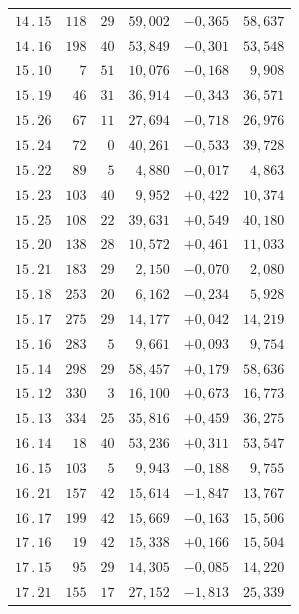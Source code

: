 \begin{center}
\begin{tabular}[t]{|c|r@{\;}r@{\;}r|r|r|}
$14\, .\, 15$ & $118$ & $29$ & $59{,}002$ & $-0{,}365$ & $58{,}637$\\
$14\, .\, 16$ & $198$ & $40$ & $53{,}849$ & $-0{,}301$ & $53{,}548$\\[7pt]
$15\, .\, 10$ & $7$ & $51$ & $10{,}076$ & $-0{,}168$ & $9{,}908$\\
$15\, .\, 19$ & $46$ & $31$ & $36{,}914$ & $-0{,}343$ & $36{,}571$\\
$15\, .\, 26$ & $67$ & $11$ & $27{,}694$ & $-0{,}718$ & $26{,}976$\\
$15\, .\, 24$ & $72$ & $0$ & $40{,}261$ & $-0{,}533$ & $39{,}728$\\
$15\, .\, 22$ & $89$ & $5$ & $4{,}880$ & $-0{,}017$ & $4{,}863$\\
$15\, .\, 23$ & $103$ & $40$ & $9{,}952$ & $+0{,}422$ & $10{,}374$\\
$15\, .\, 25$ & $108$ & $22$ & $39{,}631$ & $+0{,}549$ & $40{,}180$\\
$15\, .\, 20$ & $138$ & $28$ & $10{,}572$ & $+0{,}461$ & $11{,}033$\\
$15\, .\, 21$ & $183$ & $29$ & $2{,}150$ & $-0{,}070$ & $2{,}080$\\
$15\, .\, 18$ & $253$ & $20$ & $6{,}162$ & $-0{,}234$ & $5{,}928$\\
$15\, .\, 17$ & $275$ & $29$ & $14{,}177$ & $+0{,}042$ & $14{,}219$\\
$15\, .\, 16$ & $283$ & $5$ & $9{,}661$ & $+0{,}093$ & $9{,}754$\\
$15\, .\, 14$ & $298$ & $29$ & $58{,}457$ & $+0{,}179$ & $58{,}636$\\
$15\, .\, 12$ & $330$ & $3$ & $16{,}100$ & $+0{,}673$ & $16{,}773$\\
$15\, .\, 13$ & $334$ & $25$ & $35{,}816$ & $+0{,}459$ & $36{,}275$\\[7pt]
$16\, .\, 14$ & $18$ & $40$ & $53{,}236$ & $+0{,}311$ & $53{,}547$\\
$16\, .\, 15$ & $103$ & $5$ & $9{,}943$ & $-0{,}188$ & $9{,}755$\\
$16\, .\, 21$ & $157$ & $42$ & $15{,}614$ & $-1{,}847$ & $13{,}767$\\
$16\, .\, 17$ & $199$ & $42$ & $15{,}669$ & $-0{,}163$ & $15{,}506$\\[7pt]
$17\, .\, 16$ & $19$ & $42$ & $15{,}338$ & $+0{,}166$ & $15{,}504$\\
$17\, .\, 15$ & $95$ & $29$ & $14{,}305$ & $-0{,}085$ & $14{,}220$\\
$17\, .\, 21$ & $155$ & $17$ & $27{,}152$ & $-1{,}813$ & $25{,}339$\\

\end{tabular}
\end{center}
